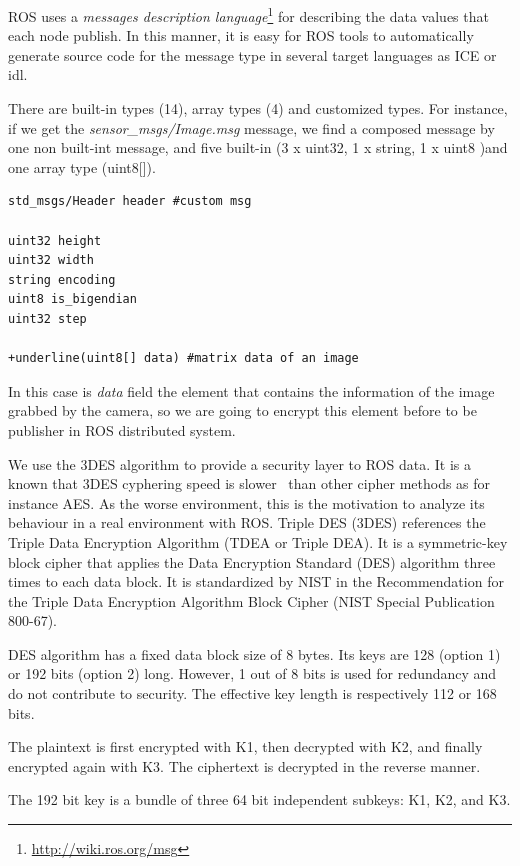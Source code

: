 \documentclass[journal,twoside]{JoPhA}
\begin{document}
ROS uses a {\em messages description language}\footnote{\url{http://wiki.ros.org/msg}} for describing the data values that each node publish. In this manner, it is easy for ROS tools to automatically generate source code for the message type in several target languages as ICE or idl. 

There are built-in types (14), array types (4) and customized types. For instance, if we get the {\em sensor\_msgs/Image.msg} message, we find a composed message by one non built-int message, and five built-in (3 x uint32, 1 x string, 1 x uint8 )and one array type (uint8[]).

{
	\footnotesize{
	\begin{Verbatim}[frame=single, commandchars=+\(\)]
std_msgs/Header header #custom msg

uint32 height
uint32 width
string encoding
uint8 is_bigendian
uint32 step

+underline(uint8[] data) #matrix data of an image
	\end{Verbatim}
	}
}

In this case is {\em data} field the element that contains the information of the image grabbed by the camera, so we are going to encrypt this element before to be publisher in ROS distributed system.



We use the 3DES algorithm to provide a security layer to ROS data.
It  is  a  known that  3DES cyphering speed is slower~\cite{singh2013study} than other cipher methods as for instance AES. As the worse environment, this is the motivation to analyze its behaviour in a real environment with ROS.
Triple DES (3DES) references the Triple Data Encryption Algorithm (TDEA or Triple DEA). It is a symmetric-key block cipher that applies the Data Encryption Standard (DES) algorithm three times to each data block. It is standardized by NIST in the Recommendation for the Triple Data Encryption Algorithm Block Cipher (NIST Special Publication 800-67).

DES algorithm has a fixed data block size of 8 bytes. Its keys are 128 (option 1) or 192 bits (option 2) long. However, 1 out of 8 bits is used for redundancy and do not contribute to security. The effective key length is respectively 112 or 168 bits.

The plaintext is first encrypted with K1, then decrypted with K2, and finally encrypted again with K3. The ciphertext is decrypted in the reverse manner.

The 192 bit key is a bundle of three 64 bit independent subkeys: K1, K2, and K3.
\end{document}

